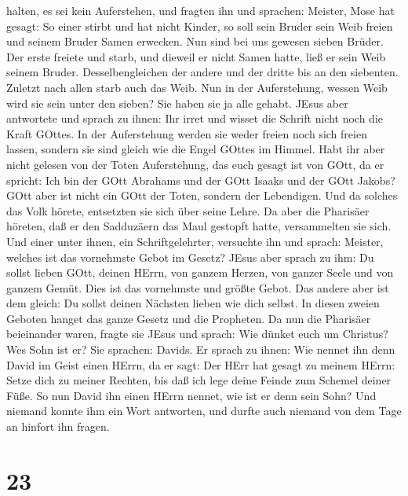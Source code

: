 halten, es sei kein Auferstehen, und fragten ihn  und
sprachen: Meister, Mose hat gesagt: So einer stirbt und hat nicht
Kinder, so soll sein Bruder sein Weib freien und seinem Bruder Samen
erwecken.  Nun sind bei uns gewesen sieben Brüder. Der
erste freiete und starb, und dieweil er nicht Samen hatte, ließ er sein
Weib seinem Bruder.  Desselbengleichen der andere und der
dritte bis an den siebenten.  Zuletzt nach allen starb auch
das Weib.  Nun in der Auferstehung, wessen Weib wird sie
sein unter den sieben? Sie haben sie ja alle gehabt.  JEsus
aber antwortete und sprach zu ihnen: Ihr irret und wisset die Schrift
nicht noch die Kraft GOttes.  In der Auferstehung werden
sie weder freien noch sich freien lassen, sondern sie sind gleich wie
die Engel GOttes im Himmel.  Habt ihr aber nicht gelesen
von der Toten Auferstehung, das euch gesagt ist von GOtt, da er spricht:
 Ich bin der GOtt Abrahams und der GOtt Isaaks und der GOtt
Jakobs? GOtt aber ist nicht ein GOtt der Toten, sondern der Lebendigen.
 Und da solches das Volk hörete, entsetzten sie sich über
seine Lehre.  Da aber die Pharisäer höreten, daß er den
Sadduzäern das Maul gestopft hatte, versammelten sie sich. 
Und einer unter ihnen, ein Schriftgelehrter, versuchte ihn und sprach:
 Meister, welches ist das vornehmste Gebot im Gesetz?
 JEsus aber sprach zu ihm: Du sollst lieben GOtt, deinen
HErrn, von ganzem Herzen, von ganzer Seele und von ganzem Gemüt.
 Dies ist das vornehmste und größte Gebot. 
Das andere aber ist dem gleich: Du sollst deinen Nächsten lieben wie
dich selbst.  In diesen zweien Geboten hanget das ganze
Gesetz und die Propheten.  Da nun die Pharisäer beieinander
waren, fragte sie JEsus  und sprach: Wie dünket euch um
Christus? Wes Sohn ist er? Sie sprachen: Davids.  Er sprach
zu ihnen: Wie nennet ihn denn David im Geist einen HErrn, da er sagt:
 Der HErr hat gesagt zu meinem HErrn: Setze dich zu meiner
Rechten, bis daß ich lege deine Feinde zum Schemel deiner Füße.
 So nun David ihn einen HErrn nennet, wie ist er denn sein
Sohn?  Und niemand konnte ihm ein Wort antworten, und
durfte auch niemand von dem Tage an hinfort ihn fragen.

\hypertarget{section-22}{%
\section{23}\label{section-22}}

